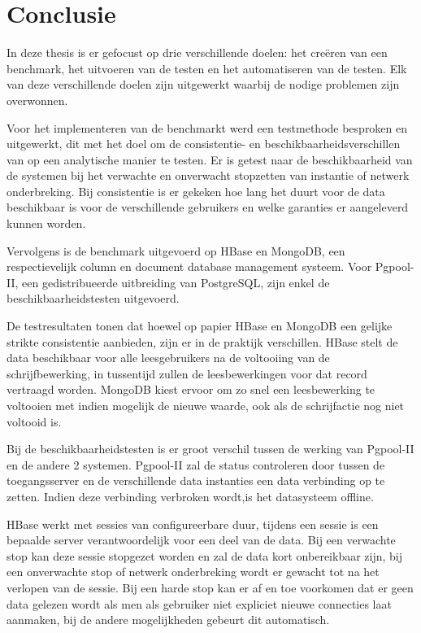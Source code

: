 \chapter{Conclusie}
In deze thesis is er gefocust op drie verschillende doelen: het creëren van een benchmark, het uitvoeren van de testen en het automatiseren van de testen. Elk van deze verschillende doelen zijn uitgewerkt waarbij de nodige problemen zijn overwonnen. 

Voor het implementeren van de benchmarkt werd een testmethode besproken en uitgewerkt, dit met het doel om de consistentie- en beschikbaarheidsverschillen van op een analytische manier te testen. Er is getest naar de beschikbaarheid van de systemen bij het verwachte en onverwacht stopzetten van instantie of netwerk onderbreking. Bij consistentie is er gekeken hoe lang het duurt voor de data beschikbaar is voor de verschillende gebruikers en welke garanties er aangeleverd kunnen worden. 

Vervolgens is de benchmark uitgevoerd op  HBase en MongoDB, een respectievelijk column en document database management systeem. Voor Pgpool-II, een gedistribueerde uitbreiding van PostgreSQL, zijn enkel de beschikbaarheidstesten uitgevoerd. 

De testresultaten tonen dat hoewel op papier HBase en MongoDB een gelijke strikte consistentie aanbieden, zijn er in de praktijk verschillen. HBase stelt de data beschikbaar voor alle leesgebruikers na de voltooiing van de schrijfbewerking, in tussentijd zullen de leesbewerkingen voor dat record vertraagd worden. MongoDB kiest ervoor om zo snel een leesbewerking te voltooien met indien mogelijk de nieuwe waarde, ook als de schrijfactie nog niet voltooid is. 

Bij de beschikbaarheidstesten is er groot verschil tussen de werking van Pgpool-II en de andere 2 systemen. Pgpool-II zal de status controleren door tussen de toegangsserver en de verschillende data instanties een data verbinding op te zetten. Indien deze verbinding verbroken wordt,is het datasysteem offline. 

HBase werkt met sessies van configureerbare duur, tijdens een sessie is een bepaalde server verantwoordelijk voor een deel van de data. Bij een verwachte stop kan deze sessie stopgezet worden en zal de data kort onbereikbaar zijn, bij een onverwachte stop of netwerk onderbreking wordt er gewacht tot na het verlopen van de sessie. Bij een harde stop kan er af en toe voorkomen dat er geen data gelezen wordt als men als gebruiker niet expliciet nieuwe connecties laat aanmaken, bij de andere mogelijkheden gebeurt dit automatisch. 

